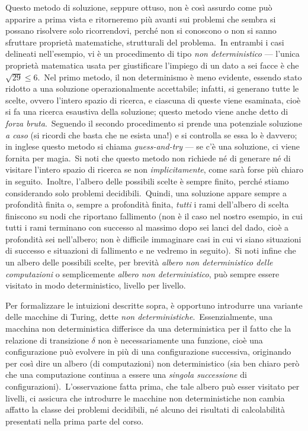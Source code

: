Questo metodo di soluzione, seppure ottuso, non è così assurdo come può apparire a prima vista e ritorneremo più avanti sui problemi che sembra si possano risolvere solo ricorrendovi, perché non si conoscono o non si sanno sfruttare proprietà matematiche, strutturali del problema.\
In entrambi i casi delineati nell'esempio, vi è un procedimento di tipo \textit{non deterministico} --- l'unica proprietà matematica usata per giustificare l'impiego di un dato a sei facce è che $\sqrt{29} \leq 6$.\
Nel primo metodo, il non determinismo è meno evidente, essendo stato ridotto a una soluzione operazionalmente accettabile; infatti, si generano tutte le scelte, ovvero l'intero spazio di ricerca, e ciascuna di queste viene esaminata, cioè si fa una ricerca esaustiva della soluzione; questo metodo viene anche detto di \textit{forza bruta}.\
Seguendo il secondo procedimento si prende una potenziale soluzione \textit{a caso} (si ricordi che basta che ne esista una!) e si controlla se essa lo è davvero; in inglese questo metodo si chiama \textit{guess-and-try} --- se c'è una soluzione, ci viene fornita per magia.\
Si noti che questo metodo non richiede né di generare né di visitare l'intero spazio di ricerca se non \textit{implicitamente}, come sarà forse più chiaro in seguito.\
Inoltre, l'albero delle possibili scelte è sempre finito, perché stiamo considerando solo problemi decidibili.\
Quindi, una soluzione appare sempre a profondità finita o, sempre a profondità finita, \textit{tutti} i rami dell'albero di scelta finiscono su nodi che riportano fallimento (non è il caso nel nostro esempio, in cui tutti i rami terminano con successo al massimo dopo sei lanci del dado, cioè a profondità sei nell'albero; non è difficile immaginare casi in cui vi siano situazioni di successo e situazioni di fallimento e ne vedremo in seguito).\
Si noti infine che un albero delle possibili scelte, per brevità \textit{albero non deterministico delle computazioni} o semplicemente \textit{albero non deterministico}, può sempre essere visitato in modo deterministico, livello per livello.\

Per formalizzare le intuizioni descritte sopra, è opportuno introdurre una variante delle macchine di Turing, dette \textit{non deterministiche}.\
Essenzialmente, una macchina non deterministica differisce da una deterministica per il fatto che la relazione di transizione $\delta$ non è necessariamente una funzione, cioè una configurazione può evolvere in più di una configurazione successiva, originando per così dire un albero (di computazioni) non deterministico (sia ben chiaro però che una computazione continua a essere una \textit{singola successione} di configurazioni).\
L'osservazione fatta prima, che tale albero può esser visitato per livelli, ci assicura che introdurre le macchine non deterministiche non cambia affatto la classe dei problemi decidibili, né alcuno dei risultati di calcolabilità presentati nella prima parte del corso.\


